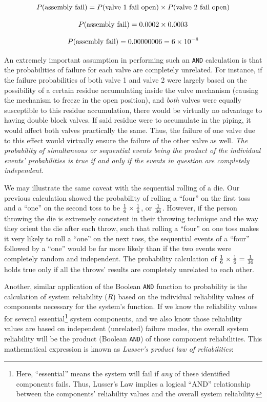 $$P(\hbox{assembly fail}) = P(\hbox{valve 1 fail open}) \times P(\hbox{valve 2 fail open})$$

$$P(\hbox{assembly fail}) = 0.0002 \times 0.0003$$

$$P(\hbox{assembly fail}) = 0.00000006 = 6 \times 10^{-8}$$

An extremely important assumption in performing such an \texttt{AND} calculation is that the probabilities of failure for each valve are completely unrelated.  For instance, if the failure probabilities of both valve 1 and valve 2 were largely based on the possibility of a certain residue accumulating inside the valve mechanism (causing the mechanism to freeze in the open position), and \textit{both} valves were equally susceptible to this residue accumulation, there would be virtually no advantage to having double block valves.  If said residue were to accumulate in the piping, it would affect both valves practically the same.  Thus, the failure of one valve due to this effect would virtually ensure the failure of the other valve as well.  \textit{The probability of simultaneous or sequential events being the product of the individual events' probabilities is true if and only if the events in question are completely independent.}

We may illustrate the same caveat with the sequential rolling of a die.  Our previous calculation showed the probability of rolling a ``four'' on the first toss and a ``one'' on the second toss to be ${1 \over 6} \times {1 \over 6}$, or $1 \over 36$.  However, if the person throwing the die is extremely consistent in their throwing technique and the way they orient the die after each throw, such that rolling a ``four'' on one toss makes it very likely to roll a ``one'' on the next toss, the sequential events of a ``four'' followed by a ``one'' would be far more likely than if the two events were completely random and independent.  The probability calculation of ${1 \over 6} \times {1 \over 6} = {1 \over 36}$ holds true only if all the throws' results are completely unrelated to each other.

\vskip 10pt

\filbreak

Another, similar application of the Boolean \texttt{AND} function to probability is the calculation of system reliability ($R$) based on the individual reliability values of components necessary for the system's function.  If we know the reliability values for several essential\footnote{Here, ``essential'' means the system will fail if \textit{any} of these identified components fails.  Thus, Lusser's Law implies a logical ``AND'' relationship between the components' reliability values and the overall system reliability.} system components, and we also know those reliability values are based on independent (unrelated) failure modes, the overall system reliability will be the product (Boolean \texttt{AND}) of those component reliabilities.  This mathematical expression is known as \textit{Lusser's product law of reliabilities}:    

